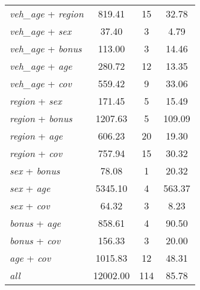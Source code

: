 {\begin{ThreePartTable}
\begin{longtable}{lccc}
    \textit{veh\_age} + \textit{region} &   819.41 &       15 &    32.78 \\
    \textit{veh\_age} + \textit{sex} &    37.40 &        3 &     4.79 \\
    \textit{veh\_age} + \textit{bonus} &   113.00 &        3 &    14.46 \\
    \textit{veh\_age} + \textit{age} &   280.72 &       12 &    13.35 \\
    \textit{veh\_age} + \textit{cov} &   559.42 &        9 &    33.06 \\
    \textit{region} + \textit{sex} &   171.45 &        5 &    15.49 \\
    \textit{region} + \textit{bonus} &  1207.63 &        5 &   109.09 \\
    \textit{region} + \textit{age} &   606.23 &       20 &    19.30 \\
    \textit{region} + \textit{cov} &   757.94 &       15 &    30.32 \\
    \textit{sex} + \textit{bonus} &    78.08 &        1 &    20.32 \\
    \textit{sex} + \textit{age} &  5345.10 &        4 &   563.37 \\
    \textit{sex} + \textit{cov} &    64.32 &        3 &     8.23 \\
    \textit{bonus} + \textit{age} &   858.61 &        4 &    90.50 \\
    \textit{bonus} + \textit{cov} &   156.33 &        3 &    20.00 \\
    \textit{age} + \textit{cov} &  1015.83 &       12 &    48.31 \\
    \textit{all}\tnote{\ddag} & 12002.00 &      114 &    85.78 \\

\end{longtable}
\end{ThreePartTable}
}
